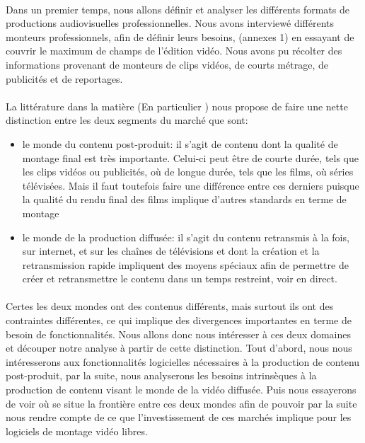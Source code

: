 \paragraph{}

Dans un premier temps, nous allons définir et analyser les
différents formats de productions audiovisuelles professionnelles.
Nous avons interviewé
différents monteurs professionnels, afin de définir leurs besoins,
(annexes 1) en essayant de
couvrir le maximum de champs de l'édition vidéo. Nous
avons pu récolter des informations provenant de monteurs de clips
vidéos, de courts métrage, de publicités et de reportages.

\paragraph{}

La littérature dans la matière (En particulier \cite{WorldVideoNonlinearEditingMarket})
nous propose de faire une nette distinction entre  les deux segments du marché que sont:

\begin{itemize} \setlength{\itemsep}{2mm}

  \item {le monde du contenu post-produit: il s'agit de contenu dont la qualité de
    montage final est très importante. Celui-ci peut être de courte durée, tels que les clips
    vidéos ou publicités, où de longue durée, tels que les films, où séries télévisées. Mais
    il faut toutefois faire une différence entre ces derniers puisque la qualité du
    rendu final des films implique d'autres standards en terme de montage}

  \item {le monde de la production diffusée: il s'agit du contenu retransmis à la fois,
    sur internet, et sur les chaînes de télévisions et dont la création et la retransmission
    rapide impliquent des moyens spéciaux afin de permettre de créer et retransmettre
    le contenu dans un temps restreint, voir en direct.}

\end{itemize}

\paragraph{}

Certes les deux mondes ont des contenus différents, mais surtout ils ont des contraintes différentes,
ce qui implique des divergences importantes en terme de besoin de fonctionnalités. Nous allons donc
nous intéresser à ces deux domaines et découper notre analyse à partir de cette distinction. Tout
d'abord, nous nous intéresserons aux fonctionnalités logicielles nécessaires à la production
de contenu post-produit, par la suite, nous analyserons les besoins intrinsèques à la production de contenu
visant le monde de la vidéo diffusée. Puis nous essayerons de voir où se situe la frontière entre ces
deux mondes afin de pouvoir par la suite nous rendre compte de ce que l'investissement de ces marchés
implique pour les logiciels de montage vidéo libres.

